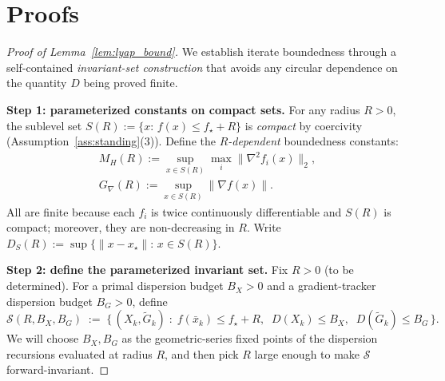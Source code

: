 \documentclass[review,onefignum,onetabnum]{siamart171218}
\begin{document}

\section{Proofs}\label{app:proofs}

\begin{proof}[Proof of Lemma~\ref{lem:lyap_bound}]
We establish iterate boundedness through a self-contained
\emph{invariant-set construction} that avoids any circular dependence
on the quantity $D$ being proved finite.

\smallskip
\noindent\textbf{Step 1: parameterized constants on compact sets.}
For any radius $R>0$, the sublevel set
$S(R):=\{x:\,f(x)\le f_\star+R\}$
is \emph{compact} by coercivity (Assumption~\ref{ass:standing}(3)).
Define the \emph{$R$-dependent} boundedness constants:
\begin{gather*}
  M_H(R):=\sup_{x\in S(R)}\max_i\|\nabla^2 f_i(x)\|_2,\\
  G_\nabla(R):=\sup_{x\in S(R)}\|\nabla f(x)\|.
\end{gather*}
All are finite because each $f_i$ is twice continuously differentiable
and $S(R)$ is compact; moreover, they are non-decreasing in $R$.
Write $D_S(R):=\sup\{\|x-x_\star\|:\,x\in S(R)\}$.

\smallskip
\noindent\textbf{Step 2: define the parameterized invariant set.}
Fix $R>0$ (to be determined).
For a primal dispersion budget $B_X>0$ and a gradient-tracker
dispersion budget $B_G>0$, define
\[
  \mathcal S(R,B_X,B_G) \;:=\;
  \bigl\{\,(X_k,\tilde G_k)\;:\;
  f(\bar x_k)\le f_\star+R,\;\;
  D(X_k)\le B_X,\;\;
  D(\tilde G_k)\le B_G
  \,\bigr\}.
\]
We will choose $B_X,B_G$ as the geometric-series fixed points of the
dispersion recursions evaluated at radius $R$, and then pick $R$ large
enough to make $\mathcal S$ forward-invariant.


\end{proof}
\end{document}
